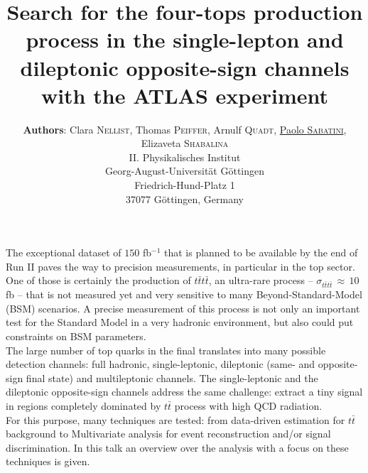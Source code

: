 \documentclass[12pt,a4paper]{article}
\title{\large \textbf{Search for the four-tops production process in the single-lepton and dileptonic opposite-sign channels with the ATLAS experiment}}
\author{\vspace{5mm}\textbf{Authors}: Clara \textsc{Nellist}, Thomas \textsc{Peiffer}, Arnulf \textsc{Quadt}, \underline{Paolo \textsc{Sabatini}}, Elizaveta \textsc{Shabalina}\\[2mm]
{\scriptsize
\hspace{1.8cm} II. Physikalisches Institut\\[0.5mm]
\hspace{1.8cm} Georg-August-Universität Göttingen\\[0.5mm]
\hspace{1.8cm} Friedrich-Hund-Platz 1\\[0.5mm]
\hspace{1.8cm} 37077 Göttingen, Germany\\[0.5mm]
}
}
\date{}
\makeatletter
\renewcommand{\maketitle}{\bgroup\setlength{\parindent}{0pt}
\begin{flushleft}
  \textbf{\@title}

  \@author
\end{flushleft}\egroup
}
\makeatother
\begin{document}
\maketitle
{ \setlength{\parindent}{0cm}
\begin{small}

The exceptional dataset of $150$ fb$^{-1}$ that is planned to be available by the end of Run II paves the way to precision measurements, in particular in the top sector. One of those is certainly the production of $t\bar{t}t\bar{t}$, an ultra-rare process -- $\sigma_{t\bar{t}t\bar{t}}\,\approx\,10$ fb -- that is not measured yet and very sensitive to many Beyond-Standard-Model (BSM) scenarios. A precise measurement of this process is not only an important test for the Standard Model in a very hadronic environment, but also could put constraints on BSM parameters. \\

The large number of top quarks in the final translates into many possible detection channels: full hadronic, single-leptonic, dileptonic (same- and opposite-sign final state) and multileptonic channels. The single-leptonic and the dileptonic opposite-sign channels address the same challenge: extract a tiny signal in regions completely dominated by $t\bar{t}$ process with high QCD radiation.\\

For this purpose, many techniques are tested: from data-driven estimation for $t\bar{t}$ background to Multivariate analysis for event reconstruction and/or signal discrimination. In this talk an overview over the analysis with a focus on these techniques is given.



\end{small}


}
\end{document}
